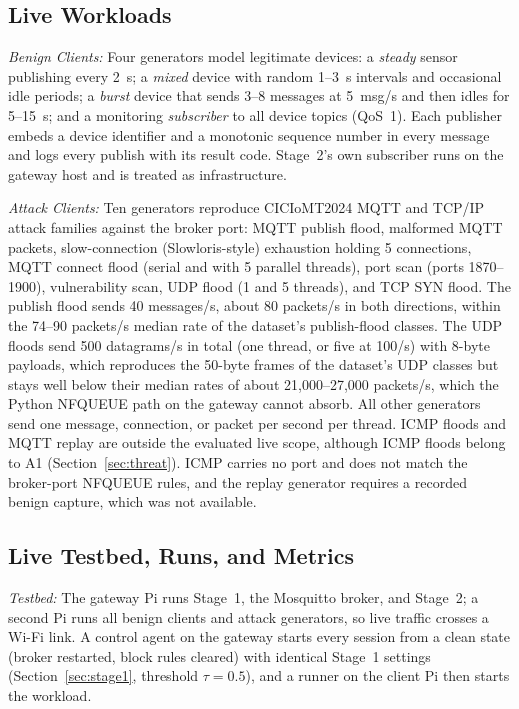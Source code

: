 \documentclass[journal]{IEEEtran}
\begin{document}
\subsection{Live Workloads}

\textit{Benign Clients:} Four generators model legitimate devices: a \emph{steady} sensor publishing every 2~s; a \emph{mixed} device with random 1--3~s intervals and occasional idle periods; a \emph{burst} device that sends 3--8 messages at 5~msg/s and then idles for 5--15~s; and a monitoring \emph{subscriber} to all device topics (QoS~1). Each publisher embeds a device identifier and a monotonic sequence number in every message and logs every publish with its result code. Stage~2's own subscriber runs on the gateway host and is treated as infrastructure.

\textit{Attack Clients:} Ten generators reproduce CICIoMT2024 MQTT and TCP/IP attack families against the broker port: MQTT publish flood, malformed MQTT packets, slow-connection (Slowloris-style) exhaustion holding 5 connections, MQTT connect flood (serial and with 5 parallel threads), port scan (ports 1870--1900), vulnerability scan, UDP flood (1 and 5 threads), and TCP SYN flood. The publish flood sends 40 messages/s, about 80 packets/s in both directions, within the 74--90 packets/s median rate of the dataset's publish-flood classes. The UDP floods send 500 datagrams/s in total (one thread, or five at 100/s) with 8-byte payloads, which reproduces the 50-byte frames of the dataset's UDP classes but stays well below their median rates of about 21,000--27,000 packets/s, which the Python NFQUEUE path on the gateway cannot absorb. All other generators send one message, connection, or packet per second per thread. ICMP floods and MQTT replay are outside the evaluated live scope, although ICMP floods belong to A1 (Section~\ref{sec:threat}). ICMP carries no port and does not match the broker-port NFQUEUE rules, and the replay generator requires a recorded benign capture, which was not available.

\subsection{Live Testbed, Runs, and Metrics}
\label{sec:protocol}

\textit{Testbed:} The gateway Pi runs Stage~1, the Mosquitto broker, and Stage~2; a second Pi runs all benign clients and attack generators, so live traffic crosses a Wi-Fi link. A control agent on the gateway starts every session from a clean state (broker restarted, block rules cleared) with identical Stage~1 settings (Section~\ref{sec:stage1}, threshold $\tau = 0.5$), and a runner on the client Pi then starts the workload.
\end{document}
